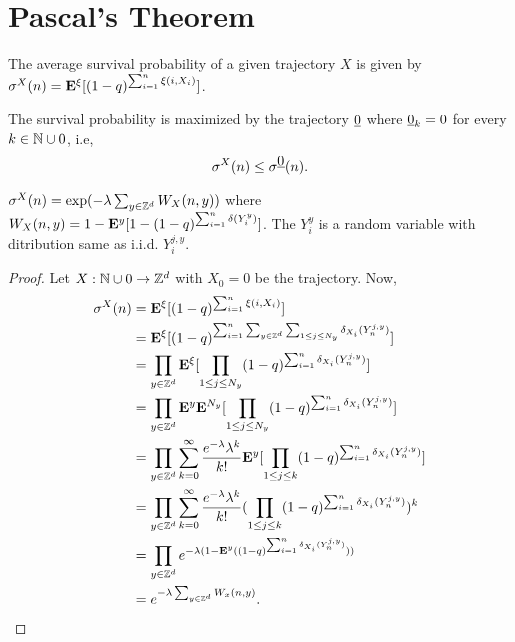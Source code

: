 \documentclass[main]{subfiles}
\begin{document}
\section{Pascal's Theorem}
The average survival probability of a given trajectory $X$ is given by $\sigma^X(n)=\mathbf E^\xi[(1-q)^{\sum_{i=1}^{n}\xi(i,X_i)}]$.
\begin{theorem}[Pascal]
    The survival probability is maximized by the trajectory $\zero$ where $\zero_k=0$ for every $k \in \mathbb N\cup{0}$, i.e,
    $$\sigma^X(n)\leq \sigma^\zero(n).$$
\end{theorem}
\begin{lemma}
    $\sigma^X(n)=\exp (-\lambda \sum_{y \in \mathbb Z^d}W_X(n,y))$ where $W_X(n,y)=1-\mathbf E^y[1-(1-q)^{\sum_{i=1}^{n}\delta(Y_i^y)}]$. The $Y_i^y$ is a random variable with ditribution same as i.i.d. $Y_i^{j,y}$.
\end{lemma}
\begin{proof}
    Let $X:\mathbb N\cup {0} \rightarrow \mathbb Z^d$ with $X_0=0$ be the trajectory.
    Now,
    \begin{equation*}
        \begin{aligned}
            \sigma^X(n) & =\mathbf E^\xi[(1-q)^{\sum_{i=1}^{n}\xi(i,X_i)}]                                                                                                       \\
                        & =\mathbf E^\xi[(1-q)^{\sum_{i=1}^{n}\sum_{y \in \mathbb Z^d}\sum_{1\leq j \leq N_y} \delta_{X_i}(Y^{j,y}_n)}]                                                 \\
                        & =\prod_{y \in \mathbb Z^d}\mathbf E^\xi[\prod_{1\leq j \leq N_y}(1-q)^{\sum_{i=1}^{n}\delta_{X_i}(Y^{j,y}_n)}]                                                \\
                        & =\prod_{y \in \mathbb Z^d}\mathbf E^y\mathbf E^{N_y}[\prod_{1\leq j \leq N_y}(1-q)^{\sum_{i=1}^{n}\delta_{X_i}(Y^{j,y}_n)}]                                          \\
                        & =\prod_{y \in \mathbb Z^d}\sum_{k=0}^{\infty}\frac{e^{-\lambda}\lambda^k}{k!}\mathbf E^y[\prod_{1\leq j \leq k}(1-q)^{\sum_{i=1}^{n}\delta_{X_i}(Y^{j,y}_n)}] \\
                        & =\prod_{y \in \mathbb Z^d}\sum_{k=0}^{\infty}\frac{e^{-\lambda}\lambda^k}{k!}(\prod_{1\leq j \leq k}(1-q)^{\sum_{i=1}^{n}\delta_{X_i}(Y^{j,y}_n)})^k   \\
                        & =\prod_{y \in \mathbb Z^d}e^{-\lambda(1-\mathbf E^y((1-q)^{\sum_{i=1}^{n}\delta_{X_i}(Y^{j,y}_n)}))}                                                          \\
                        & =e^{-\lambda\sum_{y\in\mathbb{Z}^d}W_x(n,y)}.
        \end{aligned}
    \end{equation*}

\end{proof}
\end{document}
